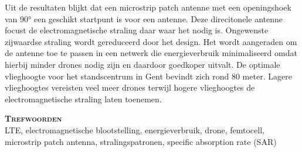 Uit de resultaten blijkt dat een microstrip patch antenne
met een openingshoek van \ang{90} een geschikt startpunt is voor een antenne.
Deze direcitonele  antenne focust de electromagnetische straling daar waar het nodig is.
Ongewenste zijwaardse straling wordt gereduceerd door het design.
Het wordt aangeraden om de antenne toe te passen in een netwerk die energieverbruik minimaliseerd
omdat hierbij minder drones nodig zijn en daardoor goedkoper uitvalt.
De optimale vlieghoogte voor het standscentrum in Gent bevindt zich rond 80  meter.
Lagere vlieghoogtes vereisten veel meer drones terwijl hogere vlieghoogtes de 
electromagnetische straling laten toenemen.

\textsc{\textbf{\LARGE Trefwoorden}}\\

LTE, electromagnetische blootstelling, energieverbruik, drone, femtocell, microstrip patch antenna, stralingspatronen, specific absorption rate (SAR)

